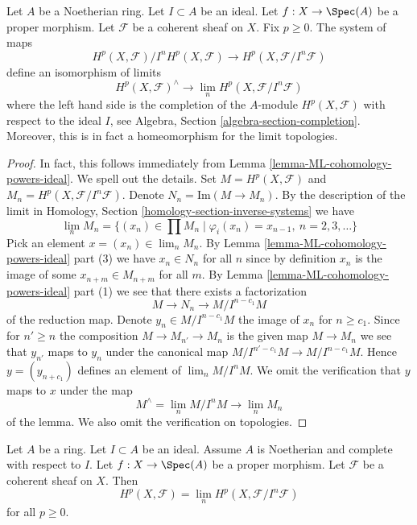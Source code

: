 \begin{theorem}
\label{theorem-formal-functions}
Let $A$ be a Noetherian ring.
Let $I \subset A$ be an ideal.
Let $f : X \to \Spec(A)$ be a proper morphism.
Let $\mathcal{F}$ be a coherent sheaf on $X$.
Fix $p \geq 0$.
The system of maps
$$
H^p(X, \mathcal{F})/I^nH^p(X, \mathcal{F})
\longrightarrow
H^p(X, \mathcal{F}/I^n\mathcal{F})
$$
define an isomorphism of limits
$$
H^p(X, \mathcal{F})^\wedge
\longrightarrow
\lim_n H^p(X, \mathcal{F}/I^n\mathcal{F})
$$
where the left hand side is the completion of the $A$-module
$H^p(X, \mathcal{F})$ with respect to the ideal $I$, see
Algebra, Section \ref{algebra-section-completion}.
Moreover, this is in fact a homeomorphism for the limit topologies.
\end{theorem}

\begin{proof}
In fact, this follows immediately from
Lemma \ref{lemma-ML-cohomology-powers-ideal}. We spell out the details.
Set $M = H^p(X, \mathcal{F})$ and $M_n = H^p(X, \mathcal{F}/I^n\mathcal{F})$.
Denote $N_n = \text{Im}(M \to M_n)$.
By the description of the limit in Homology, Section
\ref{homology-section-inverse-systems} we have
$$
\lim_n M_n
=
\{(x_n) \in \prod M_n \mid \varphi_i(x_n) = x_{n - 1}, \ n = 2, 3, \ldots\}
$$
Pick an element $x = (x_n) \in \lim_n M_n$.
By Lemma \ref{lemma-ML-cohomology-powers-ideal} part (3)
we have $x_n \in N_n$ for all $n$ since by
definition $x_n$ is the image of some $x_{n + m} \in M_{n + m}$ for
all $m$. By Lemma \ref{lemma-ML-cohomology-powers-ideal} part (1)
we see that there exists a factorization
$$
M \to N_n \to M/I^{n - c_1}M
$$
of the reduction map. Denote $y_n \in M/I^{n - c_1}M$ the image of $x_n$
for $n \geq c_1$. Since for $n' \geq n$ the composition
$M \to M_{n'} \to M_n$ is the given map $M \to M_n$ we see that
$y_{n'}$ maps to $y_n$ under the canonical map
$M/I^{n' - c_1}M \to M/I^{n - c_1}M$. Hence $y = (y_{n + c_1})$
defines an element of $\lim_n M/I^nM$.
We omit the verification that $y$ maps to $x$ under the
map
$$
M^\wedge = \lim_n M/I^nM \longrightarrow \lim_n M_n
$$
of the lemma. We also omit the verification on topologies.
\end{proof}

\begin{lemma}
\label{lemma-spell-out-theorem-formal-functions}
Let $A$ be a ring. Let $I \subset A$ be an ideal. Assume $A$ is
Noetherian and complete with respect to $I$.
Let $f : X \to \Spec(A)$ be a proper morphism.
Let $\mathcal{F}$ be a coherent sheaf on $X$.
Then
$$
H^p(X, \mathcal{F}) = \lim_n H^p(X, \mathcal{F}/I^n\mathcal{F})
$$
for all $p \geq 0$.
\end{lemma}


